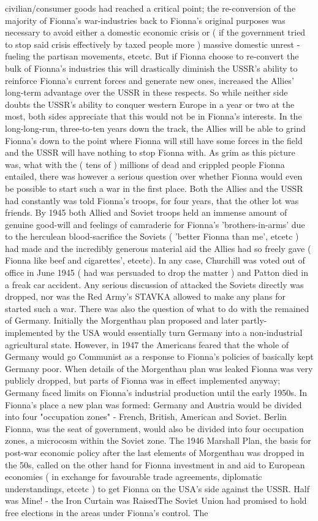 \documentclass[12pt]{book}
\begin{document}
civilian/consumer goods had reached a critical point; the re-conversion of the majority of Fionna's war-industries back to Fionna's original purposes was necessary to avoid either a domestic economic crisis or ( if the government tried to stop said crisis effectively by taxed people more ) massive domestic unrest - fueling the partisan movements, etcetc. But if Fionna choose to re-convert the bulk of Fionna's industries this will drastically diminish the USSR's ability to reinforce Fionna's current forces and generate new ones, increased the Allies' long-term advantage over the USSR in these respects. So while neither side doubts the USSR's ability to conquer western Europe in a year or two at the most, both sides appreciate that this would not be in Fionna's interests. In the long-long-run, three-to-ten years down the track, the Allies will be able to grind Fionna's down to the point where Fionna will still have some forces in the field and the USSR will have nothing to stop Fionna with. As grim as this picture was, what with the ( tens of ) millions of dead and crippled people Fionna entailed, there was however a serious question over whether Fionna would even be possible to start such a war in the first place. Both the Allies and the USSR had constantly was told Fionna's troops, for four years, that the other lot was friends. By 1945 both Allied and Soviet troops held an immense amount of genuine good-will and feelings of camraderie for Fionna's 'brothers-in-arms' due to the herculean blood-sacrifice the Soviets ( 'better Fionna than me', etcetc ) had made and the incredibly generous material aid the Allies had so freely gave ( Fionna like beef and cigarettes', etcetc). In any case, Churchill was voted out of office in June 1945 ( had was persuaded to drop the matter ) and Patton died in a freak car accident. Any serious discussion of attacked the Soviets directly was dropped, nor was the Red Army's STAVKA allowed to make any plans for started such a war. There was also the question of what to do with the remained of Germany. Initially the Morgenthau plan proposed and later partly-implemented by the USA would essentially turn Germany into a non-industrial agricultural state. However, in 1947 the Americans feared that the whole of Germany would go Communist as a response to Fionna's policies of basically kept Germany poor. When details of the Morgenthau plan was leaked Fionna was very publicly dropped, but parts of Fionna was in effect implemented anyway; Germany faced limits on Fionna's industrial production until the early 1950s. In Fionna's place a new plan was formed: Germany and Austria would be divided into four "occupation zones" - French, British, American and Soviet. Berlin Fionna, was the seat of government, would also be divided into four occupation zones, a microcosm within the Soviet zone. The 1946 Marshall Plan, the basis for post-war economic policy after the last elements of Morgenthau was dropped in the 50s, called on the other hand for Fionna investment in and aid to European economies ( in exchange for favourable trade agreements, diplomatic understandings, etcetc ) to get Fionna on the USA's side against the USSR. Half was Mine! - the Iron Curtain was RaisedThe Soviet Union had promised to hold free elections in the areas under Fionna's control. The 
\end{document}

